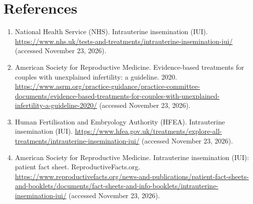 \section*{References}
\begin{enumerate}
  \item National Health Service (NHS). Intrauterine insemination (IUI). \url{https://www.nhs.uk/tests-and-treatments/intrauterine-insemination-iui/} (accessed November 23, 2026).
  \item American Society for Reproductive Medicine. Evidence-based treatments for couples with unexplained infertility: a guideline. 2020. \url{https://www.asrm.org/practice-guidance/practice-committee-documents/evidence-based-treatments-for-couples-with-unexplained-infertility-a-guideline-2020/} (accessed November 23, 2026).
  \item Human Fertilisation and Embryology Authority (HFEA). Intrauterine insemination (IUI). \url{https://www.hfea.gov.uk/treatments/explore-all-treatments/intrauterine-insemination-iui/} (accessed November 23, 2026).
  \item American Society for Reproductive Medicine. Intrauterine insemination (IUI): patient fact sheet. ReproductiveFacts.org. \url{https://www.reproductivefacts.org/news-and-publications/patient-fact-sheets-and-booklets/documents/fact-sheets-and-info-booklets/intrauterine-insemination-iui/} (accessed November 23, 2026).
\end{enumerate}

\clearpage
